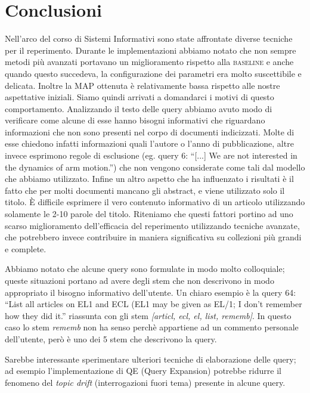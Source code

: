 \documentclass{llncs}
\begin{document}






\section{Conclusioni}
\label{sec:conclusioni}
Nell'arco del corso di Sistemi Informativi sono state affrontate diverse tecniche per il reperimento. Durante le implementazioni abbiamo notato che non sempre metodi pi\`u avanzati portavano un miglioramento rispetto alla \textsc{baseline} e anche quando questo succedeva, la configurazione dei parametri era molto suscettibile e delicata. Inoltre la MAP ottenuta \`e relativamente bassa rispetto alle nostre aspettative iniziali. Siamo quindi arrivati a domandarci i motivi di questo comportamento. Analizzando il testo delle query abbiamo avuto modo di verificare come alcune di esse hanno bisogni informativi che riguardano informazioni che non sono presenti nel corpo di documenti indicizzati. Molte di esse chiedono infatti informazioni quali l'autore o l'anno di pubblicazione, altre invece esprimono regole di esclusione (eg. query 6: ``[...] We are not interested in the dynamics of arm motion.'') che non vengono considerate come tali dal modello che abbiamo utilizzato. Infine un altro aspetto che ha influenzato i risultati \`e il fatto che per molti documenti mancano gli abstract, e viene utilizzato solo il titolo. \`E difficile esprimere il vero contenuto informativo di un articolo utilizzando solamente le 2-10 parole del titolo. Riteniamo che questi fattori portino ad uno scarso miglioramento dell'efficacia del reperimento utilizzando tecniche avanzate, che potrebbero invece contribuire in maniera significativa su collezioni pi\`u grandi e complete. 

Abbiamo notato che alcune query sono formulate in modo molto colloquiale; queste situazioni portano ad avere degli stem che non descrivono in modo appropriato il bisogno informativo dell'utente. Un chiaro esempio \`e la query 64: ``List all articles on EL1 and ECL (EL1 may be given as EL/1; I don't remember how they did it.'' riassunta con gli stem \textit{[articl, ecl, el, list, rememb]}. In questo caso lo stem \textit{rememb} non ha senso perch\`e appartiene ad un commento personale dell'utente, per\`o \`e uno dei 5 stem che descrivono la query.

Sarebbe interessante sperimentare ulteriori tecniche di elaborazione delle query; ad esempio l'implementazione di QE (Query Expansion) potrebbe ridurre il fenomeno del \textit{topic drift} (interrogazioni fuori tema) presente in alcune query.
\end{document}
